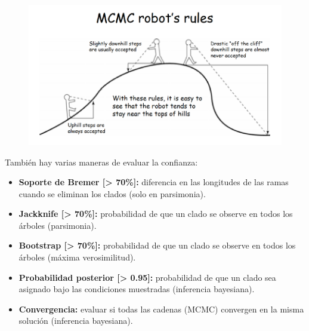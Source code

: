 \begin{figure}[htbp]
\centering
\includegraphics[width=0.6\linewidth]{figs/mcmc-rules.png}
\end{figure}

También hay varias maneras de evaluar la confianza:
\begin{itemize}
\item \textbf{Soporte de Bremer [> 70\%]:} diferencia en las longitudes de las ramas cuando se eliminan los clados (solo en parsimonia).
\item \textbf{Jackknife [> 70\%]:} probabilidad de que un clado se observe en todos los árboles (parsimonia).
\item \textbf{Bootstrap [> 70\%]:} probabilidad de que un clado se observe en todos los árboles (máxima verosimilitud).
\item \textbf{Probabilidad posterior [> 0.95]:} probabilidad de que un clado sea asignado bajo las condiciones muestradas (inferencia bayesiana).
\item \textbf{Convergencia:} evaluar si todas las cadenas (MCMC) convergen en la misma
solución (inferencia bayesiana).
\end{itemize}